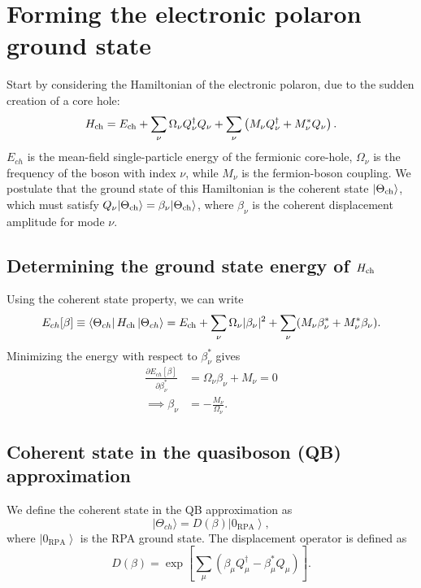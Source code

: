 \section{Forming the electronic polaron ground state}
Start by considering the Hamiltonian of the electronic polaron, due to the sudden creation of a core hole:
\begin{equation}
H_{\rm ch}
=
E_{\rm ch}
+
\sum_\nu
\Omega_\nu Q_\nu^\dagger Q_\nu
+
\sum_\nu
\left(
M_\nu Q_\nu^\dagger
+
M_\nu^* Q_\nu
\right).
\end{equation}
$E_{ch}$ is the mean-field single-particle energy of the fermionic core-hole, \(\Omega_\nu\) is the frequency of the boson with index \(\nu\), while \(M_\nu\) is the fermion-boson coupling.
We postulate that the ground state of this Hamiltonian is the coherent state $|\Theta_{\rm ch}\rangle$, which must satisfy $Q_\nu |\Theta_{\rm ch}\rangle = \beta_\nu |\Theta_{\rm ch}\rangle$, where \(\beta_\nu\) is the coherent displacement amplitude for mode \(\nu\).
\subsection{Determining the ground state energy of \(H_{\rm ch}\)}
\label{sec:polaron_ground_state_energy}
Using the coherent state property, we can write 
\begin{equation}
    E_{ch}[\beta] \equiv \bra{\Theta_{ch}} H_{\rm ch} \ket{\Theta_{ch}} = E_{\rm ch} + \sum_\nu \Omega_\nu |\beta_\nu|^2 + \sum_\nu (M_\nu \beta_\nu^* + M_\nu^* \beta_\nu).
\end{equation}
Minimizing the energy with respect to \(\beta_\nu^*\) gives
\begin{align}
    \frac{\partial E_{ch}[\beta]}{\partial \beta_\nu^*} &= \Omega_\nu \beta_\nu + M_\nu = 0\\ \implies \beta_\nu &= -\frac{M_\nu}{\Omega_\nu}.
\end{align}

\subsection{Coherent state in the quasiboson (QB) approximation}
We define the coherent state in the QB approximation as
\begin{equation}
    |\Theta_{ch}\rangle = D(\beta)\left|0_{\mathrm{RPA}}\right\rangle,
\end{equation} 
where \(\left|0_{\mathrm{RPA}}\right\rangle\) is the RPA ground state. The displacement operator is defined as
\begin{equation}
    D(\beta)=\exp \left[\sum_\mu\left(\beta_\mu Q_\mu^{\dagger}-\beta_\mu^* Q_\mu\right)\right] .
\end{equation}
